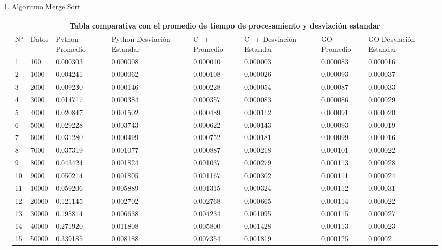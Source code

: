 \documentclass{article}
\begin{document}
\begin{enumerate}
        
        
        \item Algoritmo Merge Sort
        
 \begin{tabular}{ |p{0.3cm}||p{0.9cm}|p{1.5cm}|p{1.7cm}|p{1.5cm}|p{1.7cm}|p{1.8cm}|p{1.7cm}|  }
 \hline
 \multicolumn{8}{|c|}{Tabla comparativa con el promedio de tiempo de procesamiento y desviación estandar} \\
 \hline
 N°& Datos &Python Promedio &Python Desviación Estandar &C++ Promedio &C++ Desviación Estandar &GO Promedio &GO Desviación Estandar\\
 \hline
1	&100	&0.000303	&0.000008	&0.000010	&0.000003	&0.000083	&0.000016\\
2	&1000	&0.004241	&0.000062	&0.000108	&0.000026	&0.000093	&0.000037\\
3	&2000	&0.009230	&0.000146	&0.000228	&0.000054	&0.000087	&0.000033\\
4	&3000	&0.014717	&0.000384	&0.000357	&0.000083	&0.000086	&0.000029\\
5	&4000	&0.020847	&0.001502	&0.000489	&0.000112	&0.000091	&0.000020\\
6	&5000	&0.029228	&0.003743	&0.000622	&0.000143	&0.000093	&0.000019\\
7	&6000	&0.031280	&0.000499	&0.000752	&0.000181	&0.000099	&0.000016\\
8	&7000	&0.037319	&0.001077	&0.000887	&0.000218	&0.000101	&0.000022\\
9	&8000	&0.043424	&0.001824	&0.001037	&0.000279	&0.000113	&0.000028\\
10	&9000	&0.050214	&0.001805	&0.001167	&0.000302	&0.000111	&0.000024\\
11	&10000	&0.059206	&0.005889	&0.001315	&0.000324	&0.000112	&0.000031\\
12	&20000	&0.121145	&0.002702	&0.002768	&0.000665	&0.000114	&0.000022\\
13	&30000	&0.195814	&0.006638	&0.004234	&0.001095	&0.000115	&0.000027\\
14	&40000	&0.271920	&0.011808	&0.005800	&0.001428	&0.000113	&0.000023\\
15	&50000	&0.339185	&0.008188	&0.007354	&0.001819	&0.000125	&0.00002\\

\hline
\end{tabular}


\end{enumerate}
\end{document}

